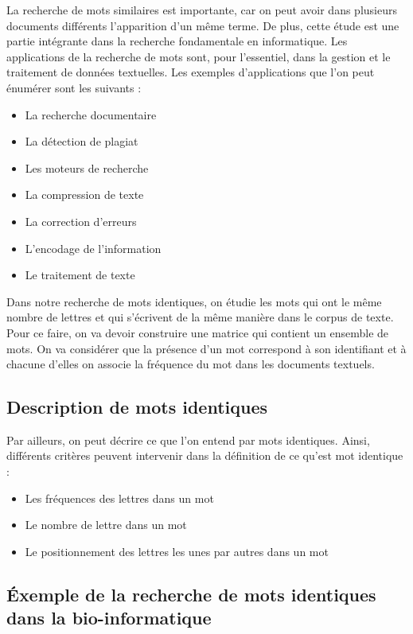 \documentclass[a4paper,10pt]{article}
\begin{document}
La recherche de mots similaires est importante,
car on peut avoir dans plusieurs documents différents
l’apparition d’un même terme.
De plus, cette étude est une partie intégrante dans la
recherche fondamentale en informatique.
Les applications de la recherche de mots sont, pour l’essentiel,
dans la gestion et le traitement de données textuelles.
Les exemples d’applications que l’on peut énumérer
sont les suivants :

\begin{itemize}
\item La recherche documentaire
\item La détection de plagiat
\item Les moteurs de recherche
\item La compression de texte
\item La correction d’erreurs
\item L’encodage de l’information
\item Le traitement de texte
\end{itemize}

Dans notre recherche de mots identiques,
on étudie les mots qui ont le même nombre de lettres et qui
s’écrivent de la même manière dans le corpus de texte.
Pour ce faire, on va devoir construire une matrice qui contient
un ensemble de mots.
On va considérer que la présence d’un mot correspond à son
identifiant et à chacune d’elles on associe la fréquence du mot
dans les documents textuels.

\subsection*{Description de mots identiques}

Par ailleurs, on peut décrire ce que l’on entend par mots
identiques. Ainsi, différents critères peuvent intervenir dans
la définition de ce qu’est mot identique :

\begin{itemize}
\item Les fréquences des lettres dans un mot
\item Le nombre de lettre dans un mot
\item Le positionnement des lettres les unes par autres dans un mot
\end{itemize}

\subsection*{\'Exemple de la recherche de mots identiques
dans la bio-informatique}
\end{document}
